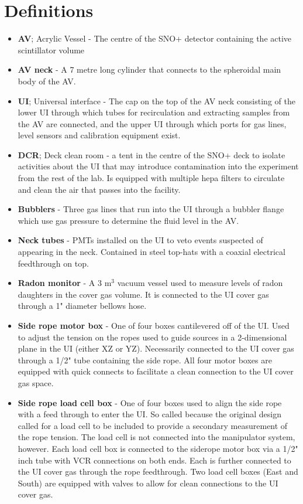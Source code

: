 \documentclass[11pt]{article}
\begin{document}
\section{Definitions}
\begin{itemize}
\item {\bf AV}; Acrylic Vessel - The centre of the SNO+ detector containing the active scintillator volume
\item {\bf AV neck} - A 7 metre long cylinder that connects to the spheroidal main body of the AV. 
\item {\bf UI}; Universal interface - The cap on the top of the AV neck consisting of the lower UI through which tubes for recirculation and extracting samples from the AV are connected, and the upper UI through which ports for gas lines, level sensors and calibration equipment exist. 
\item {\bf DCR}; Deck clean room - a tent in the centre of the SNO+ deck to isolate activities about the UI that may introduce contamination into the experiment from the rest of the lab. Is equipped with multiple hepa filters to circulate and clean the air that passes into the facility. 
\item {\bf Bubblers} - Three gas lines that run into the UI through a bubbler flange which use gas pressure to determine the fluid level in the AV. 
\item {\bf Neck tubes} - PMTs installed on the UI to veto events suspected of appearing in the neck. Contained in steel top-hats with a coaxial electrical feedthrough on top. 
\item {\bf Radon monitor} - A 3 m$^{3}$ vacuum vessel used to measure levels of radon daughters in the cover gas volume. It is connected to the UI cover gas through a 1" diameter bellows hose. 
\item {\bf Side rope motor box} - One of four boxes cantilevered off of the UI. Used to adjust the tension on the ropes used to guide sources in a 2-dimensional plane in the UI (either XZ or YZ). Necessarily connected to the UI cover gas through a 1/2" tube containing the side rope. All four motor boxes are equipped with quick connects to facilitate a clean connection to the UI cover gas space.
\item {\bf Side rope load cell box} - One of four boxes used to align the side rope with a feed through to enter the UI. So called because the original design called for a load cell to be included to provide a secondary measurement of the rope tension. The load cell is not connected into the manipulator system, however. Each load cell box is connected to the siderope motor box via a 1/2" inch tube with VCR connections on both ends. Each is further connected to the UI cover gas through the rope feedthrough. Two load cell boxes (East and South) are equipped with valves to allow for clean connections to the UI cover gas.  
\end{itemize}
\end{document}
